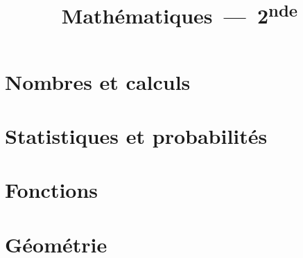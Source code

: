 \documentclass{poly}
\title{Mathématiques~---~2\textsuperscript{nde}}
\author{}
\date{\figureA{}}
\begin{document}
\maketitle
\tableofcontents


\part{Nombres et calculs}










\part{Statistiques et probabilités}








\part{Fonctions}








\part{Géométrie}










\pagenotes
\end{document}
